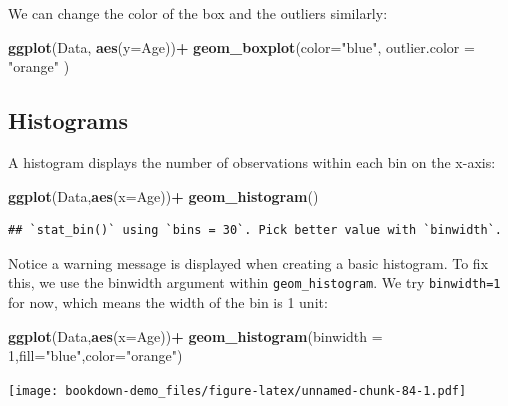 \documentclass[
]{book}
\newenvironment{Shaded}{\begin{snugshade}}{\end{snugshade}}
\newcommand{\AttributeTok}[1]{\textcolor[rgb]{0.13,0.29,0.53}{#1}}
\newcommand{\DecValTok}[1]{\textcolor[rgb]{0.00,0.00,0.81}{#1}}
\newcommand{\FunctionTok}[1]{\textcolor[rgb]{0.13,0.29,0.53}{\textbf{#1}}}
\newcommand{\NormalTok}[1]{#1}
\newcommand{\SpecialCharTok}[1]{\textcolor[rgb]{0.81,0.36,0.00}{\textbf{#1}}}
\newcommand{\StringTok}[1]{\textcolor[rgb]{0.31,0.60,0.02}{#1}}
\begin{document}
We can change the color of the box and the outliers similarly:

\begin{Shaded}
\begin{Highlighting}[]
\FunctionTok{ggplot}\NormalTok{(Data, }\FunctionTok{aes}\NormalTok{(}\AttributeTok{y=}\NormalTok{Age))}\SpecialCharTok{+}
  \FunctionTok{geom\_boxplot}\NormalTok{(}\AttributeTok{color=}\StringTok{"blue"}\NormalTok{, }\AttributeTok{outlier.color =} \StringTok{"orange"}\NormalTok{ )}
\end{Highlighting}
\end{Shaded}

\hypertarget{histograms}{%
\subsection{Histograms}\label{histograms}}

A histogram displays the number of observations within each bin on the x-axis:

\begin{Shaded}
\begin{Highlighting}[]
\FunctionTok{ggplot}\NormalTok{(Data,}\FunctionTok{aes}\NormalTok{(}\AttributeTok{x=}\NormalTok{Age))}\SpecialCharTok{+}
  \FunctionTok{geom\_histogram}\NormalTok{()}
\end{Highlighting}
\end{Shaded}

\begin{verbatim}
## `stat_bin()` using `bins = 30`. Pick better value with `binwidth`.
\end{verbatim}

Notice a warning message is displayed when creating a basic histogram. To fix this, we use the binwidth argument within \texttt{geom\_histogram}. We try \texttt{binwidth=1} for now, which means the width of the bin is 1 unit:

\begin{Shaded}
\begin{Highlighting}[]
\FunctionTok{ggplot}\NormalTok{(Data,}\FunctionTok{aes}\NormalTok{(}\AttributeTok{x=}\NormalTok{Age))}\SpecialCharTok{+}
  \FunctionTok{geom\_histogram}\NormalTok{(}\AttributeTok{binwidth =} \DecValTok{1}\NormalTok{,}\AttributeTok{fill=}\StringTok{"blue"}\NormalTok{,}\AttributeTok{color=}\StringTok{"orange"}\NormalTok{)}
\end{Highlighting}
\end{Shaded}

\texttt{[image: bookdown-demo\_files/figure-latex/unnamed-chunk-84-1.pdf]}
\end{document}
